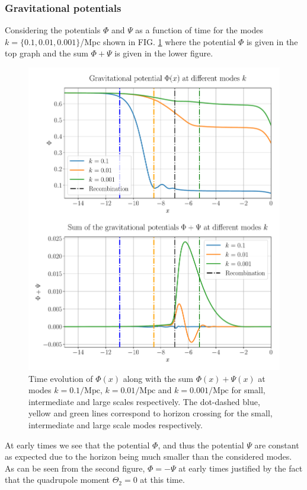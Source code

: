 \documentclass[%
reprint,
 amsmath,amssymb,
 aps,
]{revtex4-2}
\begin{document}
\subsubsection{Gravitational potentials}
Considering the potentials $\Phi$ and $\Psi$ as a function of time for the modes $k=\{0.1,0.01,0.001\}$/Mpc shown in FIG. \ref{fig:phi_psi} where the potential $\Phi$ is given in the top graph and the sum $\Phi+\Psi$ is given in the lower figure. 
\begin{figure}[ht!]
	\includegraphics[width = \linewidth]{Figures/Phi_Psi.pdf}
	\caption{Time evolution of $\Phi(x)$ along with the sum $\Phi(x)+\Psi(x)$ at modes $k=0.1/\text{Mpc}$, $k=0.01/\text{Mpc}$ and $k=0.001/\text{Mpc}$ for small, intermediate and large scales respectively. The dot-dashed blue, yellow and green lines correspond to horizon crossing for the small, intermediate and large scale modes respectively.}
	\label{fig:phi_psi}
\end{figure}

At early times we see that the potential $\Phi$, and thus the potential $\Psi$ are constant as expected due to the horizon being much smaller than the considered modes. As can be seen from the second figure, $\Phi=-\Psi$ at early times justified by the fact that the quadrupole moment $\Theta_2=0$ at this time.
\end{document}
